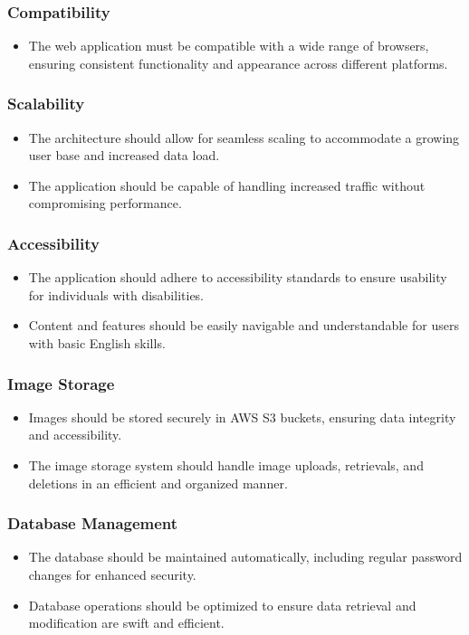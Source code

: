 
\subsubsection{Compatibility}
\begin{itemize}
	\item The web application must be compatible with a wide range of browsers, ensuring consistent functionality and appearance across different platforms.
\end{itemize}

\subsubsection{Scalability}
\begin{itemize}
	\item The architecture should allow for seamless scaling to accommodate a growing user base and increased data load.
	\item The application should be capable of handling increased traffic without compromising performance.
\end{itemize}

\subsubsection{Accessibility}
\begin{itemize}
	\item The application should adhere to accessibility standards to ensure usability for individuals with disabilities.
	\item Content and features should be easily navigable and understandable for users with basic English skills.
\end{itemize}

\subsubsection{Image Storage}
\begin{itemize}
	\item Images should be stored securely in AWS S3 buckets, ensuring data integrity and accessibility.
	\item The image storage system should handle image uploads, retrievals, and deletions in an efficient and organized manner.
\end{itemize}

\subsubsection{Database Management}
\begin{itemize}
	\item The database should be maintained automatically, including regular password changes for enhanced security.
	\item Database operations should be optimized to ensure data retrieval and modification are swift and efficient.
\end{itemize}

